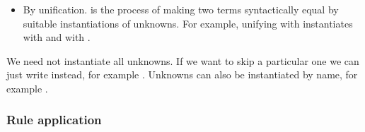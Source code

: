 \begin{isabellebody}
\begin{isamarkuptext}
\begin{itemize}
\item By unification.  is the process of making two
terms syntactically equal by suitable instantiations of unknowns. For example,
unifying  with \mbox{} instantiates
 with  and  with .
\end{itemize}
We need not instantiate all unknowns. If we want to skip a particular one we
can just write  instead, for example .
Unknowns can also be instantiated by name, for example
.


\subsubsection{Rule application}


\end{isamarkuptext}
\end{isabellebody}
